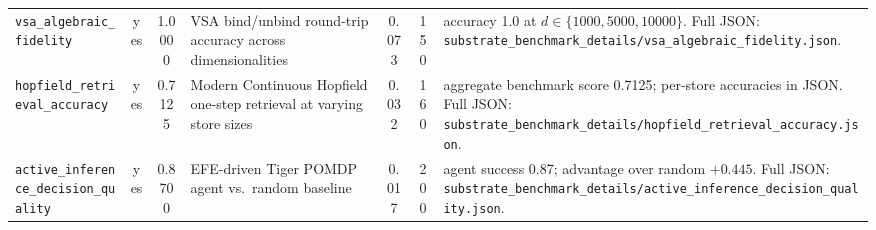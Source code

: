 \begin{table}[htbp]
\begin{tabularx}{\linewidth}{lcS[table-format=1.4]X S[table-format=1.3]c X}
\texttt{vsa\_algebraic\_fidelity} & yes & 1.0000 &
VSA bind/unbind round-trip accuracy across dimensionalities &
{0.073} & {150} &
accuracy 1.0 at $d\in\{1000,5000,10000\}$. Full JSON: \texttt{substrate\_benchmark\_details/vsa\_algebraic\_fidelity.json}. \\
\texttt{hopfield\_retrieval\_accuracy} & yes & 0.7125 &
Modern Continuous Hopfield one-step retrieval at varying store sizes &
{0.032} & {160} &
aggregate benchmark score 0.7125; per-store accuracies in JSON. Full JSON: \texttt{substrate\_benchmark\_details/hopfield\_retrieval\_accuracy.json}. \\
\texttt{active\_inference\_decision\_quality} & yes & 0.8700 &
EFE-driven Tiger POMDP agent vs.\ random baseline &
{0.017} & {200} &
agent success 0.87; advantage over random $+0.445$. Full JSON: \texttt{substrate\_benchmark\_details/active\_inference\_decision\_quality.json}. \\
\bottomrule
\end{tabularx}
\end{table}
